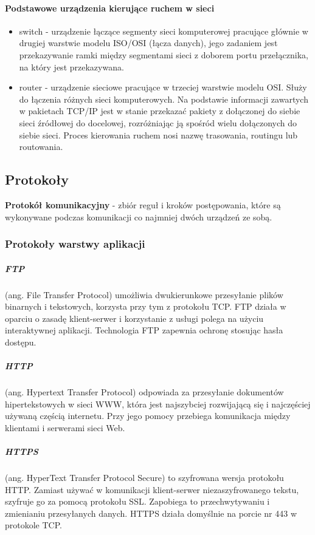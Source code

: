 \documentclass[]{report}
\begin{document}
\paragraph{Podstawowe urządzenia kierujące ruchem w sieci}
\begin{itemize}
\item switch -  urządzenie łączące segmenty sieci komputerowej pracujące głównie w drugiej warstwie modelu ISO/OSI (łącza danych), jego zadaniem jest przekazywanie ramki między segmentami sieci z doborem portu przełącznika, na który jest przekazywana.
\item router - urządzenie sieciowe pracujące w trzeciej warstwie modelu OSI. Służy do łączenia różnych sieci komputerowych. Na podstawie informacji zawartych w pakietach TCP/IP jest w stanie przekazać pakiety z dołączonej do siebie sieci źródłowej do docelowej, rozróżniając ją spośród wielu dołączonych do siebie sieci. Proces kierowania ruchem nosi nazwę trasowania, routingu lub routowania.
\end{itemize}




\subsection{Protokoły}

\textbf{Protokół komunikacyjny} - zbiór reguł i kroków postępowania, które są wykonywane podczas komunikacji co najmniej dwóch urządzeń ze sobą.
\medskip 


\subsubsection{Protokoły warstwy aplikacji}

\medskip 
\subparagraph{FTP} (ang. File Transfer Protocol) umożliwia dwukierunkowe przesyłanie plików binarnych i tekstowych, korzysta przy tym z protokołu TCP. FTP działa w oparciu o zasadę klient-serwer i korzystanie z usługi polega na użyciu interaktywnej aplikacji. Technologia FTP zapewnia ochronę stosując hasła dostępu.

\subparagraph{HTTP} (ang. Hypertext Transfer Protocol) odpowiada  za  przesyłanie  dokumentów  hipertekstowych  w  sieci  WWW,  która  jest najszybciej rozwijającą się i najczęściej używaną częścią internetu. Przy jego pomocy przebiega komunikacja między klientami i serwerami sieci Web.

\subparagraph{HTTPS} (ang. HyperText Transfer Protocol Secure) to szyfrowana wersja protokołu HTTP. Zamiast używać w komunikacji klient-serwer niezaszyfrowanego tekstu, szyfruje go za pomocą protokołu SSL. Zapobiega to przechwytywaniu i zmienianiu przesyłanych danych.
HTTPS działa domyślnie na porcie nr 443 w protokole TCP.
\end{document}
